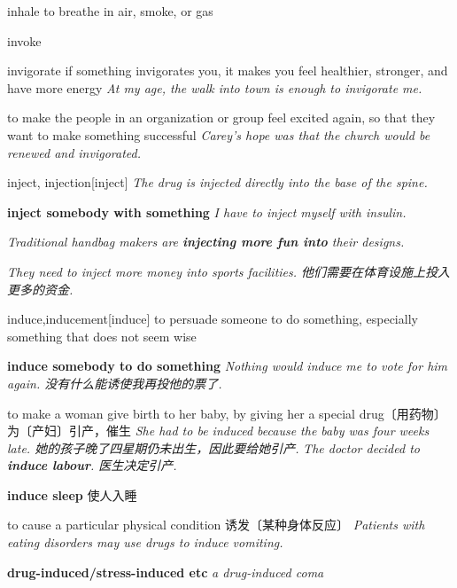 \begin{DefWord}{inhale}
    to breathe in air, smoke, or gas
\end{DefWord}

\begin{DefWord}{invoke}
\end{DefWord}

\begin{DefWord}{invigorate}
    if something invigorates you, it makes you feel healthier, stronger, and have more energy
    \textit{At my age, the walk into town is enough to invigorate me.}

    to make the people in an organization or group feel excited again, so that they want to make something successful
    \textit{Carey's hope was that the church would be renewed and invigorated.}
\end{DefWord}

\begin{DefWord}{inject, injection}[inject]
    \textit{The drug is injected directly into the base of the spine.}

    \textbf{inject somebody with something}
    \textit{I have to inject myself with insulin.}
    
    \textit{Traditional handbag makers are \textbf{injecting more fun into} their designs.}

    \textit{They need to inject more money into sports facilities. 他们需要在体育设施上投入更多的资金. }
\end{DefWord}

\begin{DefWord}{induce,inducement}[induce]
    to persuade someone to do something, especially something that does not seem wise

    \textbf{induce somebody to do something}
    \textit{Nothing would induce me to vote for him again. 没有什么能诱使我再投他的票了. }

    to make a woman give birth to her baby, by giving her a special drug〔用药物〕为〔产妇〕引产，催生
    \textit{She had to be induced because the baby was four weeks late. 她的孩子晚了四星期仍未出生，因此要给她引产. }
    \textit{The doctor decided to \textbf{induce labour}. 医生决定引产. }

    \textbf{induce sleep} 使人入睡

    to cause a particular physical condition 诱发〔某种身体反应〕
    \textit{Patients with eating disorders may use drugs to induce vomiting.}

    \textbf{drug-induced/stress-induced etc}
    \textit{a drug-induced coma}
\end{DefWord}